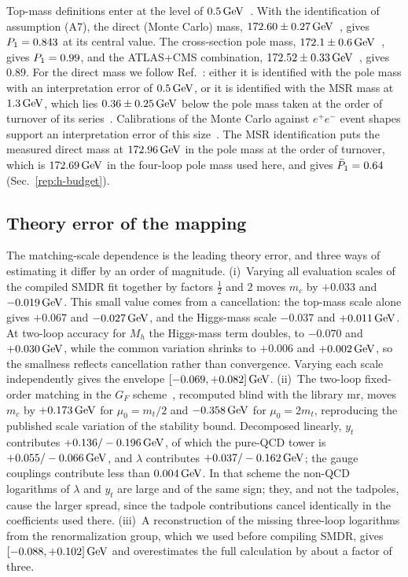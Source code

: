 Top-mass definitions enter at the level of $0.5\,\mathrm{GeV}$~\cite{Butenschoen:2016lpz,Hoang:2020iah}. %
With the identification of assumption (A7), the direct (Monte Carlo) mass, $172.60\pm0.27\,\mathrm{GeV}$~\cite{ParticleDataGroup:2026mpi}, gives $P_1=0.843$ at its central value. %
The cross-section pole mass, $172.1\pm0.6\,\mathrm{GeV}$~\cite{ParticleDataGroup:2026mpi}, gives $P_1=0.99$, and the ATLAS+CMS combination, $172.52\pm0.33\,\mathrm{GeV}$~\cite{ATLAS:2024dxp}, gives $0.89$. %
For the direct mass we follow Ref.~\cite{Hoang:2020iah}: either it is identified with the pole mass with an interpretation error of $0.5\,\mathrm{GeV}$, or it is identified with the MSR mass at $1.3\,\mathrm{GeV}$, which lies $0.36\pm0.25\,\mathrm{GeV}$ below the pole mass taken at the order of turnover of its series~\cite{Hoang:2017suc,Hoang:2020iah}. %
Calibrations of the Monte Carlo against $e^+e^-$ event shapes support an interpretation error of this size~\cite{Butenschoen:2016lpz}.
The MSR identification puts the measured direct mass at $172.96\,\mathrm{GeV}$ in the pole mass at the order of turnover, which is $172.69\,\mathrm{GeV}$ in the four-loop pole mass used here, and gives $\bar P_1=0.64$ (Sec.~\ref{rep:h-budget}). %

\subsection{Theory error of the mapping}
\label{sec:rb-sm-error}

The matching-scale dependence is the leading theory error, and three ways of estimating it differ by an order of magnitude.
(i)~Varying all evaluation scales of the compiled SMDR fit together by factors $\frac12$ and $2$ moves $m_c$ by $+0.033$ and $-0.019\,\mathrm{GeV}$. %
This small value comes from a cancellation: the top-mass scale alone gives $+0.067$ and $-0.027\,\mathrm{GeV}$, and the Higgs-mass scale $-0.037$ and $+0.011\,\mathrm{GeV}$. %
At two-loop accuracy for $M_h$ the Higgs-mass term doubles, to $-0.070$ and $+0.030\,\mathrm{GeV}$, while the common variation shrinks to $+0.006$ and $+0.002\,\mathrm{GeV}$, so the smallness reflects cancellation rather than convergence. %
Varying each scale independently gives the envelope $[-0.069,+0.082]\,\mathrm{GeV}$. %
(ii)~The two-loop fixed-order matching in the $G_F$ scheme~\cite{Bednyakov:2015sca,Kniehl:2016enc}, recomputed blind with the library mr, moves $m_c$ by $+0.173\,\mathrm{GeV}$ for $\mu_0=m_t/2$ and $-0.358\,\mathrm{GeV}$ for $\mu_0=2m_t$, reproducing the published scale variation of the stability bound. %
Decomposed linearly, $y_t$ contributes $+0.136/-0.196\,\mathrm{GeV}$, of which the pure-QCD tower is $+0.055/-0.066\,\mathrm{GeV}$, and $\lambda$ contributes $+0.037/-0.162\,\mathrm{GeV}$; the gauge couplings contribute less than $0.004\,\mathrm{GeV}$. %
In that scheme the non-QCD logarithms of $\lambda$ and $y_t$ are large and of the same sign; they, and not the tadpoles, cause the larger spread, since the tadpole contributions cancel identically in the coefficients used there.
(iii)~A reconstruction of the missing three-loop logarithms from the renormalization group, which we used before compiling SMDR, gives $[-0.088,+0.102]\,\mathrm{GeV}$ and overestimates the full calculation by about a factor of three. %

